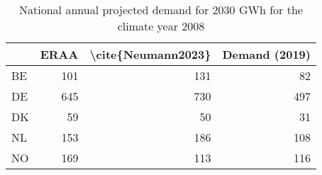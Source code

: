 \begin{table}
\centering
\caption{National annual projected demand for 2030  GWh for the climate year 2008}
\begin{tabular}{lrrr}
\toprule
{} &  ERAA &  \textbackslash cite\{Neumann2023\} &  Demand (2019) \\
\midrule
BE &   101 &                 131 &             82 \\
DE &   645 &                 730 &            497 \\
DK &    59 &                  50 &             31 \\
NL &   153 &                 186 &            108 \\
NO &   169 &                 113 &            116 \\
\bottomrule
\end{tabular}
\end{table}
